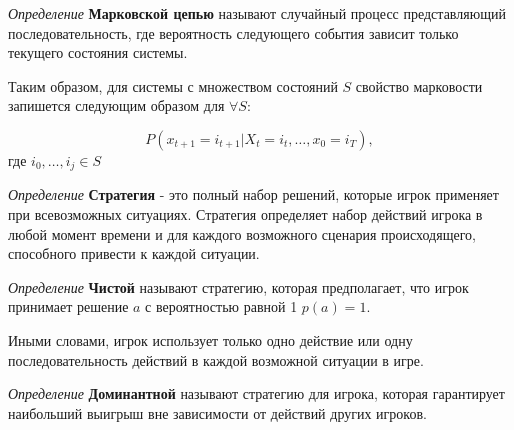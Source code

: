 
\textit{Определение} \textbf{Марковской цепью} называют случайный процесс представляющий последовательность, где вероятность следующего события зависит только текущего состояния системы. 

Таким образом, для системы с множеством состояний $S$ свойство марковости запишется следующим образом для $\forall S$:

$$
    P(x_{t+1}=i_{t+1}|X_t=i_t,\dots,x_0=i_T),
$$
 где $i_0,\dots,i_j \in S$  

\textit{Определение} \textbf{Стратегия} - это полный набор решений, которые игрок применяет при всевозможных ситуациях. Стратегия определяет набор действий игрока в любой момент времени и для каждого возможного сценария происходящего, способного привести к каждой ситуации.

\textit{Определение} \textbf{Чистой} называют стратегию, которая предполагает, что игрок принимает решение $a$ с вероятностью равной 1 $p(a)=1$. 

Иными словами, игрок использует только одно действие или одну последовательность действий в каждой возможной ситуации в игре.

\textit{Определение} \textbf{Доминантной} называют стратегию для игрока, которая гарантирует наибольший выигрыш вне зависимости от действий других игроков.



